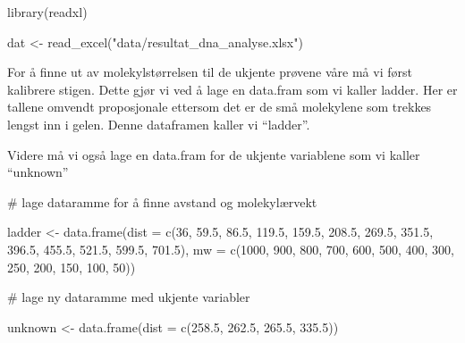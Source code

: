 \documentclass[
  letterpaper,
  DIV=11,
  numbers=noendperiod]{scrreprt}
\newenvironment{Shaded}{\begin{snugshade}}{\end{snugshade}}
\newcommand{\AttributeTok}[1]{\textcolor[rgb]{0.40,0.45,0.13}{#1}}
\newcommand{\CommentTok}[1]{\textcolor[rgb]{0.37,0.37,0.37}{#1}}
\newcommand{\DecValTok}[1]{\textcolor[rgb]{0.68,0.00,0.00}{#1}}
\newcommand{\FloatTok}[1]{\textcolor[rgb]{0.68,0.00,0.00}{#1}}
\newcommand{\FunctionTok}[1]{\textcolor[rgb]{0.28,0.35,0.67}{#1}}
\newcommand{\NormalTok}[1]{\textcolor[rgb]{0.00,0.23,0.31}{#1}}
\newcommand{\OtherTok}[1]{\textcolor[rgb]{0.00,0.23,0.31}{#1}}
\newcommand{\StringTok}[1]{\textcolor[rgb]{0.13,0.47,0.30}{#1}}
\begin{document}
\begin{Shaded}
\begin{Highlighting}[]
\FunctionTok{library}\NormalTok{(readxl)}

\NormalTok{dat }\OtherTok{\textless{}{-}} \FunctionTok{read\_excel}\NormalTok{(}\StringTok{"data/resultat\_dna\_analyse.xlsx"}\NormalTok{)}
\end{Highlighting}
\end{Shaded}

For å finne ut av molekylstørrelsen til de ukjente prøvene våre må vi
først kalibrere stigen. Dette gjør vi ved å lage en data.fram som vi
kaller ladder. Her er tallene omvendt proposjonale ettersom det er de
små molekylene som trekkes lengst inn i gelen. Denne dataframen kaller
vi ``ladder''.

Videre må vi også lage en data.fram for de ukjente variablene som vi
kaller ``unknown''

\begin{Shaded}
\begin{Highlighting}[]
\CommentTok{\# lage dataramme for å finne avstand og molekylærvekt}

\NormalTok{ladder }\OtherTok{\textless{}{-}} \FunctionTok{data.frame}\NormalTok{(}\AttributeTok{dist =} \FunctionTok{c}\NormalTok{(}\DecValTok{36}\NormalTok{, }\FloatTok{59.5}\NormalTok{, }\FloatTok{86.5}\NormalTok{,}
                              \FloatTok{119.5}\NormalTok{, }\FloatTok{159.5}\NormalTok{, }\FloatTok{208.5}\NormalTok{,}
                              \FloatTok{269.5}\NormalTok{, }\FloatTok{351.5}\NormalTok{, }\FloatTok{396.5}\NormalTok{,}
                              \FloatTok{455.5}\NormalTok{, }\FloatTok{521.5}\NormalTok{, }\FloatTok{599.5}\NormalTok{, }\FloatTok{701.5}\NormalTok{),}
                     \AttributeTok{mw =} \FunctionTok{c}\NormalTok{(}\DecValTok{1000}\NormalTok{, }\DecValTok{900}\NormalTok{, }\DecValTok{800}\NormalTok{, }
                            \DecValTok{700}\NormalTok{, }\DecValTok{600}\NormalTok{, }\DecValTok{500}\NormalTok{, }
                            \DecValTok{400}\NormalTok{, }\DecValTok{300}\NormalTok{, }\DecValTok{250}\NormalTok{, }
                            \DecValTok{200}\NormalTok{, }\DecValTok{150}\NormalTok{, }\DecValTok{100}\NormalTok{, }\DecValTok{50}\NormalTok{))}

\CommentTok{\# lage ny dataramme med ukjente variabler}

\NormalTok{unknown }\OtherTok{\textless{}{-}} \FunctionTok{data.frame}\NormalTok{(}\AttributeTok{dist =} \FunctionTok{c}\NormalTok{(}\FloatTok{258.5}\NormalTok{, }\FloatTok{262.5}\NormalTok{, }\FloatTok{265.5}\NormalTok{, }\FloatTok{335.5}\NormalTok{))}
\end{Highlighting}
\end{Shaded}
\end{document}
